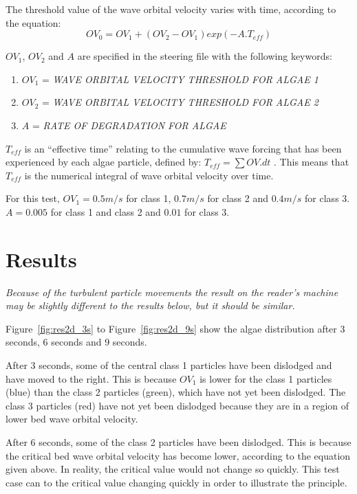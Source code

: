 \smallskip
The threshold value of the wave orbital velocity varies with time, according to the equation:
\begin{equation}
OV_0 = OV_1 + (OV_2 - OV_1) exp(-A . T_{eff})
\end{equation}

$OV_{1}$, $OV_{2}$ and $ A $ are specified in the steering file with the following keywords:

\begin{enumerate}
	\item[\nonumber] $OV_{1}$ = \textit{WAVE ORBITAL VELOCITY THRESHOLD FOR ALGAE 1}
	\item[\nonumber] $OV_{2}$ = \textit{WAVE ORBITAL VELOCITY THRESHOLD FOR ALGAE 2}
	\item[\nonumber] $A$ = \textit{RATE OF DEGRADATION FOR ALGAE}
\end{enumerate}
$T_{eff}$ is an “effective time” relating to the cumulative wave forcing that has been experienced by each algae particle, defined by: $T_{eff} = \sum { OV . dt}$ .  This means that $T_{eff}$ is the numerical integral of wave orbital velocity over time.

\smallskip
For this test, $OV_1 = 0.5 m/s$ for class 1, $0.7 m/s$ for class 2 and $0.4 m/s$ for class 3.
$A = 0.005$ for class 1 and class 2 and $0.01$ for class 3.

%
%
%
\section{Results}

\emph{Because of the turbulent particle movements the result on the reader's machine may be slightly different to the results below, but it should be similar.}

\smallskip
Figure~\ref{fig:res2d_3s} to Figure~\ref{fig:res2d_9s} show the algae distribution after 3 seconds, 6 seconds and 9 seconds.  

\smallskip
After 3 seconds, some of the central class 1 particles have been dislodged and have moved to the right.  This is because $OV_1$ is lower for the class 1 particles (blue)  than the class 2 particles (green), which have not yet been dislodged.  The class 3 particles (red) have not yet been dislodged because they are in a region of lower bed wave orbital velocity.

\smallskip
After 6 seconds, some of the class 2 particles have been dislodged.  This is because the critical bed wave orbital velocity has become lower, according to the equation given above.  In reality, the critical value would not change so quickly.  This test case can to the critical value changing quickly in order to illustrate the principle.


